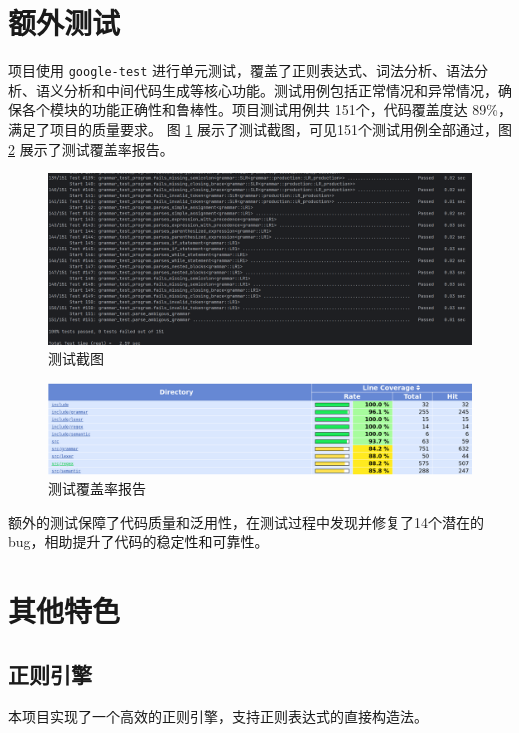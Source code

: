 \documentclass[a4paper]{article}
\begin{document}
\section{额外测试}

项目使用 \texttt{google-test} 进行单元测试，覆盖了正则表达式、词法分析、语法分析、语义分析和中间代码生成等核心功能。测试用例包括正常情况和异常情况，确保各个模块的功能正确性和鲁棒性。项目测试用例共 151个，代码覆盖度达 89\%，满足了项目的质量要求。
图 \ref{fig:test} 展示了测试截图，可见151个测试用例全部通过，图 \ref{fig:coverage} 展示了测试覆盖率报告。

\begin{figure}[H]
\centering
\includegraphics[width=\textwidth]{22.png}
\caption{测试截图}
\label{fig:test}
\end{figure}

\begin{figure}[H]
\centering
\includegraphics[width=\textwidth]{11.png}
\caption{测试覆盖率报告}
\label{fig:coverage}
\end{figure}

额外的测试保障了代码质量和泛用性，在测试过程中发现并修复了14个潜在的 bug，相助提升了代码的稳定性和可靠性。

\section{其他特色}

\subsection{正则引擎}

本项目实现了一个高效的正则引擎，支持正则表达式的直接构造法。
\end{document}
